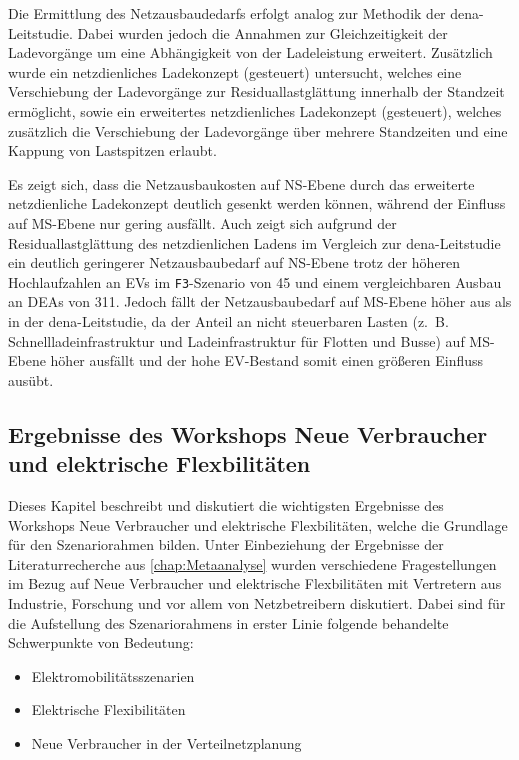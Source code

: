 Die Ermittlung des Netzausbaudedarfs erfolgt analog zur Methodik der dena-Leitstudie.
Dabei wurden jedoch die Annahmen zur Gleichzeitigkeit der Ladevorgänge um eine Abhängigkeit von der Ladeleistung erweitert.
Zusätzlich wurde ein netzdienliches Ladekonzept (gesteuert) untersucht, welches eine Verschiebung der Ladevorgänge zur Residuallastglättung innerhalb der Standzeit ermöglicht, sowie ein erweitertes netzdienliches Ladekonzept (gesteuert\Plus), welches zusätzlich die Verschiebung der Ladevorgänge über mehrere Standzeiten und eine Kappung von Lastspitzen erlaubt.\medskip

Es zeigt sich, dass die Netzausbaukosten auf \gls{NS}-Ebene durch das erweiterte netzdienliche Ladekonzept deutlich gesenkt werden können, während der Einfluss auf \gls{MS}-Ebene nur gering ausfällt.
Auch zeigt sich aufgrund der Residuallastglättung des netzdienlichen Ladens im Vergleich zur dena-Leitstudie ein deutlich geringerer Netzausbaubedarf auf \gls{NS}-Ebene trotz der höheren Hochlaufzahlen an \glspl{EV} im \texttt{F3}-Szenario von \SI{45}{\MioStk} und einem vergleichbaren Ausbau an \glspl{DEA} von \SI{311}{\gw}.
Jedoch fällt der Netzausbaubedarf auf \gls{MS}-Ebene höher aus als in der dena-Leitstudie, da der Anteil an nicht steuerbaren Lasten (z.~B. Schnellladeinfrastruktur und Ladeinfrastruktur für Flotten und Busse) auf \gls{MS}-Ebene höher ausfällt und der hohe \gls{EV}-Bestand somit einen größeren Einfluss ausübt.

\subsection{Ergebnisse des Workshops \glqq Neue Verbraucher und elektrische Flexbilitäten\grqq{}}

Dieses Kapitel beschreibt und diskutiert die wichtigsten Ergebnisse des Workshops \glqq Neue Verbraucher und elektrische Flexbilitäten\grqq{}, welche die Grundlage für den Szenariorahmen bilden.
Unter Einbeziehung der Ergebnisse der Literaturrecherche aus \ref{chap:Metaanalyse} wurden verschiedene Fragestellungen im Bezug auf \glqq Neue Verbraucher und elektrische Flexbilitäten\grqq{} mit Vertretern aus Industrie, Forschung und vor allem von Netzbetreibern diskutiert.
Dabei sind für die Aufstellung des Szenariorahmens in erster Linie folgende behandelte Schwerpunkte von Bedeutung:

\begin{itemize}
    \item Elektromobilitätsszenarien
    \item Elektrische Flexibilitäten
    \item Neue Verbraucher in der Verteilnetzplanung
\end{itemize}

